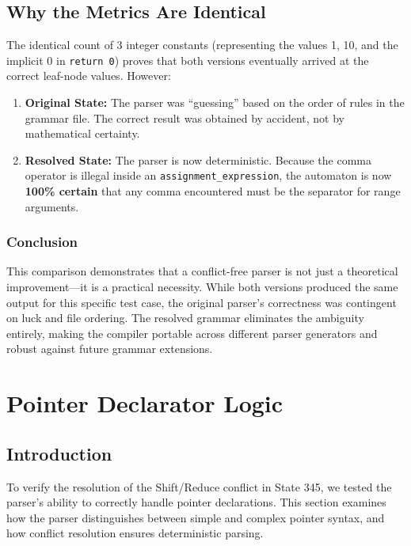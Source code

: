 \documentclass{article}
\begin{document}
\subsection{Why the Metrics Are Identical}

The identical count of 3 integer constants (representing the values 1, 10, and the implicit 0 in \texttt{return 0}) proves that both versions eventually arrived at the correct leaf-node values. However:

\begin{enumerate}
    \item \textbf{Original State:} The parser was ``guessing'' based on the order of rules in the grammar file. The correct result was obtained by accident, not by mathematical certainty.
    
    \item \textbf{Resolved State:} The parser is now deterministic. Because the comma operator is illegal inside an \texttt{assignment\_expression}, the automaton is now \textbf{100\% certain} that any comma encountered must be the separator for range arguments.
\end{enumerate}

\subsubsection{Conclusion}

This comparison demonstrates that a conflict-free parser is not just a theoretical improvement---it is a practical necessity. While both versions produced the same output for this specific test case, the original parser's correctness was contingent on luck and file ordering. The resolved grammar eliminates the ambiguity entirely, making the compiler portable across different parser generators and robust against future grammar extensions.


\section{Pointer Declarator Logic}
\label{sec:pointer_declarator_analysis}

\subsection{Introduction}

To verify the resolution of the Shift/Reduce conflict in State 345, we tested the parser's ability to correctly handle pointer declarations. This section examines how the parser distinguishes between simple and complex pointer syntax, and how conflict resolution ensures deterministic parsing.
\end{document}
